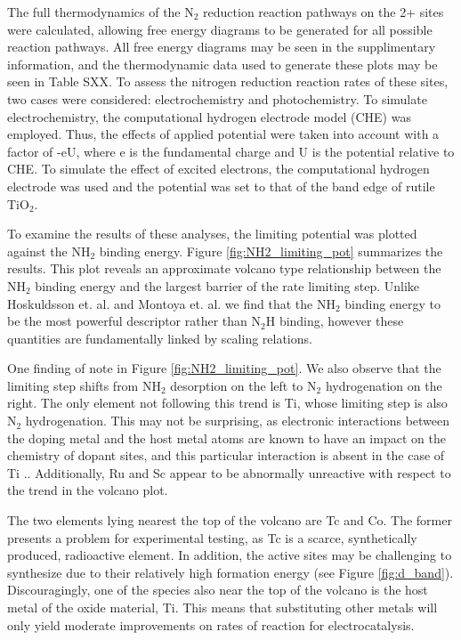 The full thermodynamics of the N$_2$ reduction reaction pathways on the 2+ sites were calculated, allowing free energy diagrams to be generated for all possible reaction pathways. All free energy diagrams may be seen in the supplimentary information, and the thermodynamic data used to generate these plots may be seen in Table SXX. To assess the nitrogen reduction reaction rates of these sites, two cases were considered: electrochemistry and photochemistry. To simulate electrochemistry, the computational hydrogen electrode model (CHE) was employed. Thus, the effects of applied potential were taken into account with a factor of -eU, where e is the fundamental charge and U is the potential relative to CHE. To simulate the effect of excited electrons, the computational hydrogen electrode was used and the potential was set to that of the band edge of rutile TiO$_2$. %

To examine the results of these analyses, the limiting potential was plotted against the NH$_2$ binding energy. Figure \ref{fig:NH2_limiting_pot} summarizes the results. This plot reveals an approximate volcano type relationship between the NH$_2$ binding energy and the largest barrier of the rate limiting step. Unlike Hoskuldsson et. al.\cite{Hoskuldsson_2017} and Montoya et. al. \cite{Montoya_2015} we find that the NH$_2$ binding energy to be the most powerful descriptor rather than N$_2$H binding, however these quantities are fundamentally linked by scaling relations.

One finding of note in Figure \ref{fig:NH2_limiting_pot}. We also observe that the limiting step shifts from NH$_2$ desorption on the left to N$_2$ hydrogenation on the right. The only element not following this trend is Ti, whose limiting step is also N$_2$ hydrogenation. This may not be surprising, as electronic interactions between the doping metal and the host metal atoms are known to have an impact on the chemistry of dopant sites, and this particular interaction is absent in the case of Ti \cite{Xu_2015}.. Additionally, Ru and Sc appear to be abnormally unreactive with respect to the trend in the volcano plot.

The two elements lying nearest the top of the volcano are Tc and Co. The former presents a problem for experimental testing, as Tc is a scarce, synthetically produced, radioactive element. In addition, the active sites may be challenging to synthesize due to their relatively high formation energy (see Figure \ref{fig:d_band}). Discouragingly, one of the species also near the top of the volcano is the host metal of the oxide material, Ti. This means that substituting other metals will only yield moderate improvements on rates of reaction for electrocatalysis.


